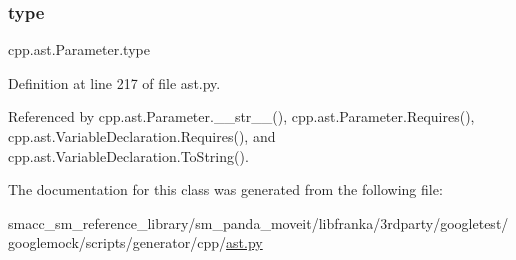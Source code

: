 \subsubsection{\texorpdfstring{type}{type}}
{\footnotesize\ttfamily cpp.\+ast.\+Parameter.\+type}



Definition at line 217 of file ast.\+py.



Referenced by cpp.\+ast.\+Parameter.\+\_\+\+\_\+str\+\_\+\+\_\+(), cpp.\+ast.\+Parameter.\+Requires(), cpp.\+ast.\+Variable\+Declaration.\+Requires(), and cpp.\+ast.\+Variable\+Declaration.\+To\+String().



The documentation for this class was generated from the following file\+:\begin{DoxyCompactItemize}
\item 
smacc\+\_\+sm\+\_\+reference\+\_\+library/sm\+\_\+panda\+\_\+moveit/libfranka/3rdparty/googletest/googlemock/scripts/generator/cpp/\hyperlink{ast_8py}{ast.\+py}\end{DoxyCompactItemize}
